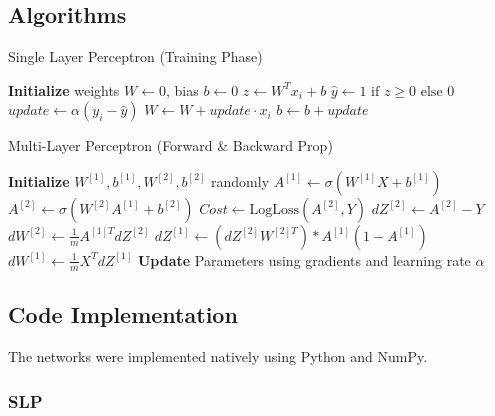 \documentclass[11pt]{article}
\begin{document}
\subsection{Algorithms}

\begin{algorithm}[H]
    \caption{Single Layer Perceptron (Training Phase)}
    \begin{algorithmic}[1]
        \State \textbf{Initialize} weights $W \gets 0$, bias $b \gets 0$
        \State $z \gets W^T x_i + b$
        \State $\hat{y} \gets 1 \text{ if } z \geq 0 \text{ else } 0$
        \State $update \gets \alpha (y_i - \hat{y})$
        \State $W \gets W + update \cdot x_i$
        \State $b \gets b + update$
        \EndFor
        \EndFor
    \end{algorithmic}
\end{algorithm}

\begin{algorithm}[H]
    \caption{Multi-Layer Perceptron (Forward \& Backward Prop)}
    \begin{algorithmic}[1]
        \State \textbf{Initialize} $W^{[1]}, b^{[1]}, W^{[2]}, b^{[2]}$ randomly
        \State $A^{[1]} \gets \sigma(W^{[1]} X + b^{[1]})$ 
        \State $A^{[2]} \gets \sigma(W^{[2]} A^{[1]} + b^{[2]})$
        \State $Cost \gets \text{LogLoss}(A^{[2]}, Y)$
        \State $dZ^{[2]} \gets A^{[2]} - Y$ 
        \State $dW^{[2]} \gets \frac{1}{m} A^{[1]T} dZ^{[2]}$
        \State $dZ^{[1]} \gets (dZ^{[2]} W^{[2]T}) * A^{[1]}(1 - A^{[1]})$
        \State $dW^{[1]} \gets \frac{1}{m} X^T dZ^{[1]}$
        \State \textbf{Update} Parameters using gradients and learning rate $\alpha$
        \EndFor
    \end{algorithmic}
\end{algorithm}

\subsection{Code Implementation}
The networks were implemented natively using Python and NumPy.
\subsubsection*{SLP}
\begin{multicols}{2}
    \inputminted{Python}{./assets/slp.py}
\end{multicols}
\end{document}
